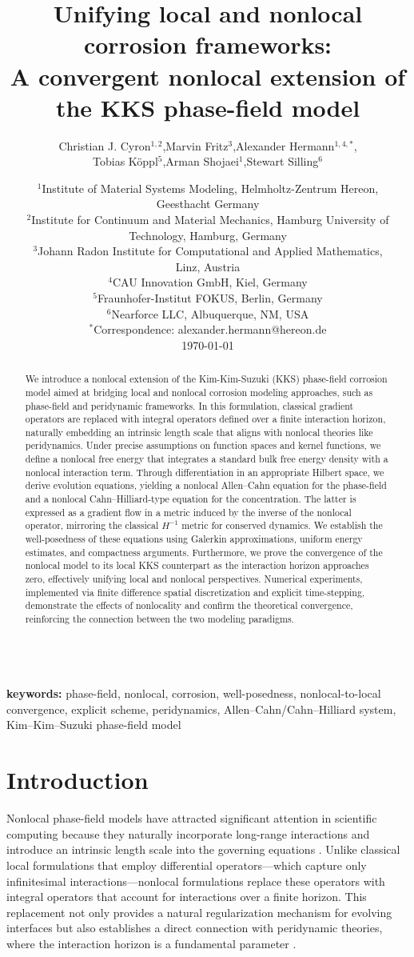 \documentclass[]{article}
\title{Unifying local and nonlocal corrosion frameworks:\\ A convergent nonlocal extension of the KKS phase-field model}
\author{Christian J. Cyron$^{1,2}$,\;Marvin Fritz$^3$,\;Alexander Hermann$^{1,4,\ast}$,\\\;Tobias K\"oppl$^5$,\;Arman Shojaei$^1$,\;Stewart Silling$^6$}
\date{%
	$^1$Institute of Material Systems Modeling, Helmholtz-Zentrum Hereon, \\Geesthacht Germany\\ [2ex]
	$^2$Institute for Continuum and Material Mechanics, Hamburg University of Technology,  Hamburg, Germany\\ [2ex]
	$^3$Johann Radon Institute for Computational and Applied Mathematics, \\Linz, Austria \\ [2ex]
	$^4$CAU Innovation GmbH, Kiel, Germany  \\ [2ex]
	$^5$Fraunhofer-Institut FOKUS, Berlin, Germany \\ [2ex]
	$^6$Nearforce LLC, Albuquerque, NM, USA \\ [2ex]
	$^\ast$Correspondence: alexander.hermann@hereon.de \\ [2ex]
	\today
}
\begin{document}
\maketitle

\begin{abstract}
We introduce a nonlocal extension of the Kim-Kim-Suzuki (KKS) phase-field corrosion model aimed at bridging local and nonlocal corrosion modeling approaches, such as phase-field and peridynamic frameworks. In this formulation, classical gradient operators are replaced with integral operators defined over a finite interaction horizon, naturally embedding an intrinsic length scale that aligns with nonlocal theories like peridynamics. Under precise assumptions on function spaces and kernel functions, we define a nonlocal free energy that integrates a standard bulk free energy density with a nonlocal interaction term. Through differentiation in an appropriate Hilbert space, we derive evolution equations, yielding a nonlocal Allen--Cahn equation for the phase-field and a nonlocal Cahn--Hilliard-type equation for the concentration. The latter is expressed as a gradient flow in a metric induced by the inverse of the nonlocal operator, mirroring the classical \(H^{-1}\) metric for conserved dynamics. We establish the well-posedness of these equations using Galerkin approximations, uniform energy estimates, and compactness arguments. Furthermore, we prove the convergence of the nonlocal model to its local KKS counterpart as the interaction horizon approaches zero, effectively unifying local and nonlocal perspectives. Numerical experiments, implemented via finite difference spatial discretization and explicit time-stepping, demonstrate the effects of nonlocality and confirm the theoretical convergence, reinforcing the connection between the two modeling paradigms.
\end{abstract}
\ \\
\textbf{keywords:} phase-field, nonlocal, corrosion, well-posedness, nonlocal-to-local convergence, explicit scheme, peridynamics, Allen--Cahn/Cahn--Hilliard system, Kim--Kim--Suzuki phase-field model

\section{Introduction}
\label{sec:introduction}

Nonlocal phase-field models have attracted significant attention in scientific computing because they naturally incorporate long-range interactions and introduce an intrinsic length scale into the governing equations \cite{silling2000reformulation}. Unlike classical local formulations that employ differential operators---which capture only infinitesimal interactions---nonlocal formulations replace these operators with integral operators that account for interactions over a finite horizon. This replacement not only provides a natural regularization mechanism for evolving interfaces but also establishes a direct connection with peridynamic theories, where the interaction horizon is a fundamental parameter \cite{silling2000reformulation}.
\end{document}
